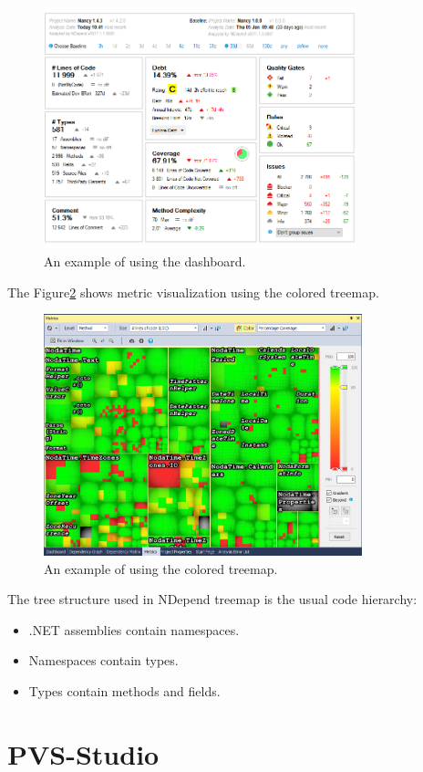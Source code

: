 \begin{figure}[h]
	\centering
	\includegraphics[height=70mm]{figures/dash.png}
	\caption{An example of using the dashboard.}
	\label{fig:dash}
\end{figure}

The Figure\ref{fig:tree} shows metric visualization using the colored treemap.

\begin{figure}[h]
	\centering
	\includegraphics[height=70mm]{figures/tree.png}
	\caption{An example of using the colored treemap.}
	\label{fig:tree}
\end{figure}

The tree structure used in NDepend treemap is the usual code hierarchy: 

\begin{itemize}
	\item .NET assemblies contain namespaces.
	\item Namespaces contain types.
	\item Types contain methods and fields.
\end{itemize}

\section{PVS-Studio}

